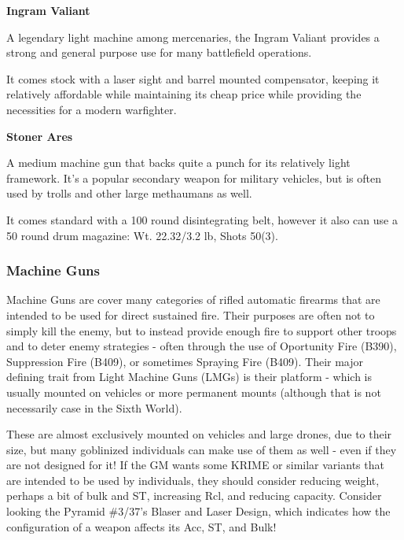 \begin{mdframed}[linewidth=0pt]
\begin{multicols}{2}

\textbf{Ingram Valiant}

A legendary light machine among mercenaries, the Ingram Valiant provides a strong and general purpose use for many battlefield operations. 

It comes stock with a laser sight and barrel mounted compensator, keeping it relatively affordable while maintaining its cheap price while providing the necessities for a modern warfighter.

\textbf{Stoner Ares}

A medium machine gun that backs quite a punch for its relatively light framework. It's a popular secondary weapon for military vehicles, but is often used by trolls and other large methaumans as well.

It comes standard with a 100 round disintegrating belt, however it also can use a 50 round drum magazine: Wt. 22.32/3.2 lb, Shots 50(3).

\end{multicols}
\end{mdframed}

\subsubsection{Machine Guns}

Machine Guns are cover many categories of rifled automatic firearms that are intended to be used for direct sustained fire. Their purposes are often not to simply kill the enemy, but to instead provide enough fire to support other troops and to deter enemy strategies - often through the use of Oportunity Fire (B390), Suppression Fire (B409), or sometimes Spraying Fire (B409). Their major defining trait from Light Machine Guns (LMGs) is their platform - which is usually mounted on vehicles or more permanent mounts (although that is not necessarily case in the Sixth World).

These are almost exclusively mounted on vehicles and large drones, due to their size, but many goblinized individuals can make use of them as well - even if they are not designed for it! If the GM wants some KRIME or similar variants that are intended to be used by individuals, they should consider reducing weight, perhaps a bit of bulk and ST, increasing Rcl, and reducing capacity. Consider looking the Pyramid \#3/37's Blaser and Laser Design, which indicates how the configuration of a weapon affects its Acc, ST, and Bulk!

